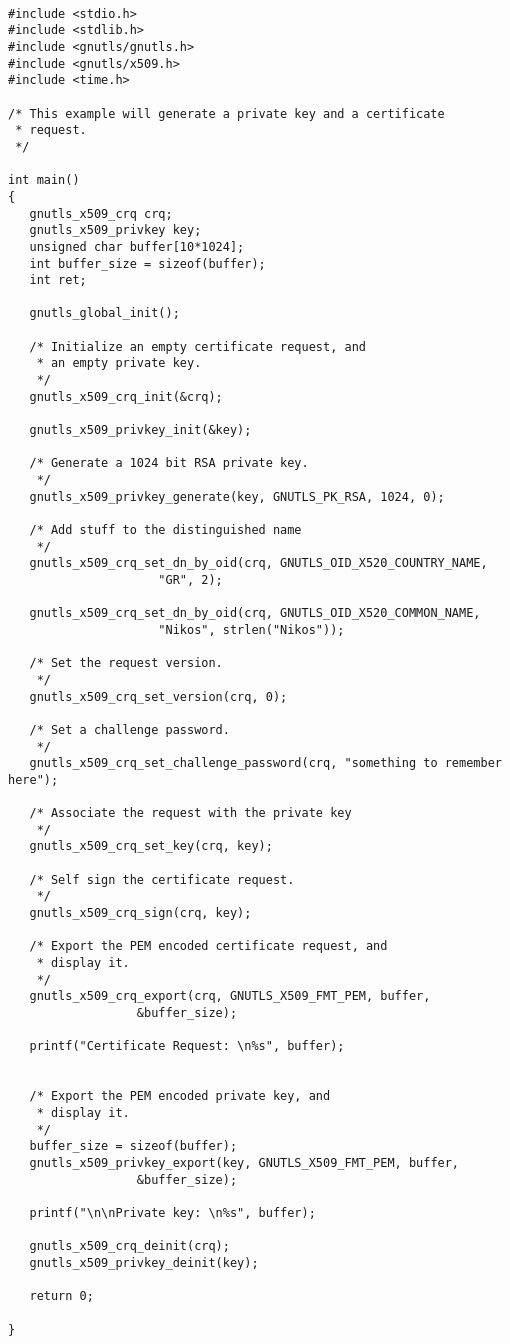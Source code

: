 \begin{verbatim}

#include <stdio.h>
#include <stdlib.h>
#include <gnutls/gnutls.h>
#include <gnutls/x509.h>
#include <time.h>

/* This example will generate a private key and a certificate
 * request.
 */

int main()
{
   gnutls_x509_crq crq;
   gnutls_x509_privkey key;
   unsigned char buffer[10*1024];
   int buffer_size = sizeof(buffer);
   int ret;

   gnutls_global_init();

   /* Initialize an empty certificate request, and
    * an empty private key.
    */
   gnutls_x509_crq_init(&crq);

   gnutls_x509_privkey_init(&key);

   /* Generate a 1024 bit RSA private key.
    */
   gnutls_x509_privkey_generate(key, GNUTLS_PK_RSA, 1024, 0);

   /* Add stuff to the distinguished name
    */
   gnutls_x509_crq_set_dn_by_oid(crq, GNUTLS_OID_X520_COUNTRY_NAME,
				     "GR", 2);

   gnutls_x509_crq_set_dn_by_oid(crq, GNUTLS_OID_X520_COMMON_NAME,
				     "Nikos", strlen("Nikos"));

   /* Set the request version.
    */
   gnutls_x509_crq_set_version(crq, 0);

   /* Set a challenge password.
    */
   gnutls_x509_crq_set_challenge_password(crq, "something to remember here");

   /* Associate the request with the private key
    */
   gnutls_x509_crq_set_key(crq, key);

   /* Self sign the certificate request.
    */
   gnutls_x509_crq_sign(crq, key);

   /* Export the PEM encoded certificate request, and
    * display it.
    */
   gnutls_x509_crq_export(crq, GNUTLS_X509_FMT_PEM, buffer,
			      &buffer_size);

   printf("Certificate Request: \n%s", buffer);


   /* Export the PEM encoded private key, and
    * display it.
    */
   buffer_size = sizeof(buffer);
   gnutls_x509_privkey_export(key, GNUTLS_X509_FMT_PEM, buffer,
				  &buffer_size);

   printf("\n\nPrivate key: \n%s", buffer);

   gnutls_x509_crq_deinit(crq);
   gnutls_x509_privkey_deinit(key);

   return 0;

}

\end{verbatim}
